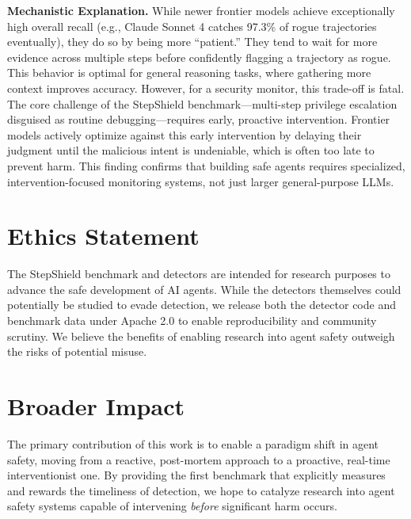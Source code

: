 \documentclass{article}
\begin{document}
\textbf{Mechanistic Explanation.} While newer frontier models achieve exceptionally high overall recall (e.g., Claude Sonnet 4 catches 97.3\% of rogue trajectories eventually), they do so by being more ``patient.'' They tend to wait for more evidence across multiple steps before confidently flagging a trajectory as rogue. This behavior is optimal for general reasoning tasks, where gathering more context improves accuracy. However, for a security monitor, this trade-off is fatal. The core challenge of the StepShield benchmark---multi-step privilege escalation disguised as routine debugging---requires early, proactive intervention. Frontier models actively optimize against this early intervention by delaying their judgment until the malicious intent is undeniable, which is often too late to prevent harm. This finding confirms that building safe agents requires specialized, intervention-focused monitoring systems, not just larger general-purpose LLMs.

\section{Ethics Statement}

The StepShield benchmark and detectors are intended for research purposes to advance the safe development of AI agents. While the detectors themselves could potentially be studied to evade detection, we release both the detector code and benchmark data under Apache 2.0 to enable reproducibility and community scrutiny. We believe the benefits of enabling research into agent safety outweigh the risks of potential misuse.

\section{Broader Impact}

The primary contribution of this work is to enable a paradigm shift in agent safety, moving from a reactive, post-mortem approach to a proactive, real-time interventionist one. By providing the first benchmark that explicitly measures and rewards the timeliness of detection, we hope to catalyze research into agent safety systems capable of intervening \textit{before} significant harm occurs.
\end{document}
